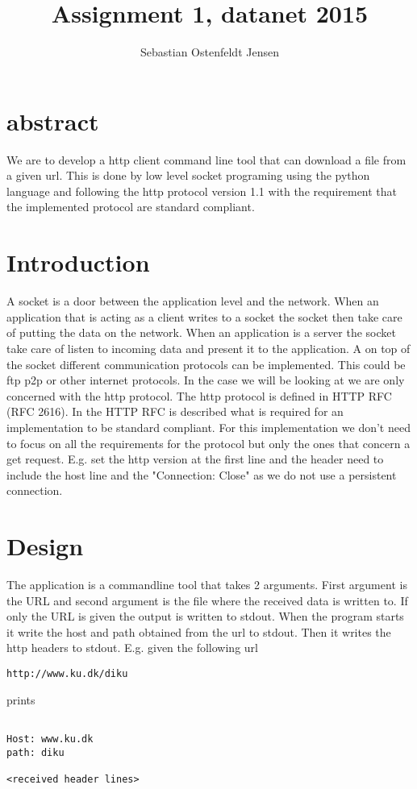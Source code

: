 \documentclass[a4paper,12pt,danish]{dnacm} %
\begin{document}

\title{Assignment 1, datanet 2015} %

\author{Sebastian Ostenfeldt Jensen
}


\maketitle

\section{abstract}
We are to develop a http client command line tool that can download a file from
a given url.
This is done by low level socket programing using the python language and
following the http protocol version 1.1 with the requirement that the
implemented protocol are standard compliant.

\section{Introduction}
A socket is a door between the application level and the network. When
an application that is acting as a client writes to a socket the socket then
take care of putting the data on the network. When an application is a server the
socket take care of listen to incoming data and present it to the application. A
on top of the socket different communication protocols can be implemented. This
could be ftp p2p or other internet protocols. In the case we will be looking at
we are only concerned with the http protocol. The http protocol is defined in
HTTP RFC (RFC 2616). In the HTTP RFC is described what is
required for an implementation to be standard compliant. For this implementation
we don't need to focus on all the requirements for the protocol but only
the ones that concern a get request. E.g. set the http version at the first line and the
header need to include the host line and the "Connection: Close" as we do not
use a persistent connection.

\section{Design}
The application is a commandline tool that takes 2 arguments. First argument is
the URL and second argument is the file where the received data is written to. If
only the URL is given the output is written to stdout. When the program starts it
write the host and path obtained from the url to stdout. Then it writes the http
headers to stdout. E.g.
given the following url
\begin{lstlisting}
http://www.ku.dk/diku
\end{lstlisting}
prints
\begin{lstlisting}

Host: www.ku.dk
path: diku

<received header lines>

\end{lstlisting}
\end{document}

